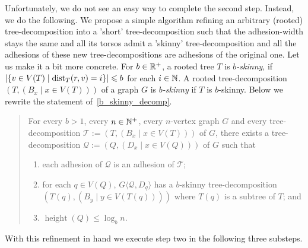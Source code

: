 \documentclass{patmorin}
\renewcommand{\le}{\leqslant}
\newcommand{\defin}[1]{\emph{\textcolor{brightmaroon}{#1}}}
\newcommand{\torso}[2]{{#1}\langle{#2}\rangle}
\DeclareMathOperator{\height}{height}
\DeclareMathOperator{\dist}{dist}
\DeclarePairedDelimiter{\set}{\{}{\}}
\begin{document}
Unfortunately, we do not see an easy way to complete the second step.
Instead, we do the following.
We propose a simple algorithm refining an arbitrary (rooted) tree-decomposition into
a 'short' tree-decomposition
such that the adhesion-width stays the same and
all its torsos admit a 'skinny' tree-decomposition and all the adhesions of these new tree-decompositions are adhesions of the original one. Let us make it a bit more concrete.
For $b\in\mathbb{R}^+$, a rooted tree $T$ is \defin{$b$-skinny},
  if $|\set{v\in V(T) \mid \dist_T(r,v)=i}|\le b$ for each $i\in\mathbb{N}$.  A rooted tree-decomposition $(T,(B_x\mid x\in V(T)))$ of a graph $G$ is \defin{$b$-skinny} if $T$ is $b$-skinny.
Below we rewrite the statement of~\cref{b_skinny_decomp}.

  \begin{quote}
    For every $b>1$, every $n\in\mathbb{N}^+$, every $n$-vertex graph $G$ and every tree-decomposition $\mathcal{T}:=(T,(B_x\mid x\in V(T)))$ of $G$, there exists a tree-decomposition $\mathcal{Q}:=(Q,(D_x\mid x\in V(Q)))$ of $G$ such that
    \begin{enumerate}[nosep,nolistsep,label=\rm(\roman*)]
      \item\label{prop_adhesion}
      each adhesion of $\mathcal{Q}$ is an adhesion of $\mathcal{T}$;
      \item\label{prop_skinny_torso} for each $q\in V(Q)$, $\torso{G}{\mathcal{Q},D_q}$ has a $b$-skinny tree-decomposition $(T(q), (B_y\mid y\in V(T(q))))$ where $T(q)$ is a subtree of $T$; and
      \item\label{prop_geometric} $\height(Q)\le \log_b n$.
    \end{enumerate}
  \end{quote}

With this refinement in hand we execute step two in the following three substeps.
\end{document}

